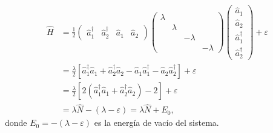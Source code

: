 \documentclass{scrartcl}
\newcommand{\inv}[1]{\frac{1}{#1}}
\renewcommand{\a}{\hat{a}}
\DeclareRobustCommand{\[}{\begin{equation}}
\DeclareRobustCommand{\]}{\end{equation}}
\begin{document}
\begin{enumerate}
\begin{enumerate}
\begin{enumerate}[(i)]
            \begin{align}
                \hat H &= \inv{2} \begin{pmatrix} \a_1^\dagger & \a_2^\dagger & \a_1 & \a_2 \end{pmatrix} \begin{pmatrix} \lambda & & & \\ & \lambda & & \\ & & -\lambda & \\ & & & -\lambda \end{pmatrix} \begin{pmatrix} \a_1 \\ \a_2 \\ \a_1^\dagger \\ \a_2^\dagger \end{pmatrix} + \varepsilon \\
                    &= \frac{\lambda}{2} \left[ \a_1^\dagger \a_1 + \a_2^\dagger \a_2 - \a_1 \a_1^\dagger - \a_2 \a_2^\dagger \right] + \varepsilon \\
                    &= \frac{\lambda}{2} \left[ 2 \left(\a_1^\dagger \a_1 + \a_2^\dagger \a_2 \right) - 2 \right] + \varepsilon \\
                    &= \lambda \hat{N} - (\lambda - \varepsilon) = \lambda \hat{N} + E_0,
            \end{align}
            donde $E_0 = -(\lambda - \varepsilon)$ es la energía de vacío del sistema.
            

\end{enumerate}
\end{enumerate}
\end{enumerate}
\end{document}
